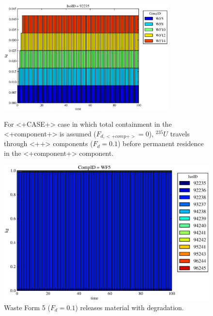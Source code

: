 \begin{figure}[ht]
\centering
\includegraphics[width=0.8\textwidth]{./chapters/demonstration/no_release/lpDMI.eps}
\caption[$^{235}U$ residence. Lumped Parameter  <+Component+> No Release.]{
For <+CASE+> case in which total containment in the <+component+> is assumed 
($F_{d,<+comp+>}=0$), $^{235}U$ travels through <++> components ($F_d = 0.1$) before 
permanent residence in the <+component+> component.
}
\label{fig:lpDMIall}
\begin{minipage}[b]{0.45\linewidth}

  \includegraphics[width=\textwidth]{./chapters/demonstration/no_release/lpDMI1.eps}
  \caption[LPDMI Waste Form Contaminants.]{
    Waste Form 5 ($F_d = 0.1$) releases material with degradation. 
    }
  \label{fig:lpDMIwf5}
  

\end{minipage}
\end{figure}
